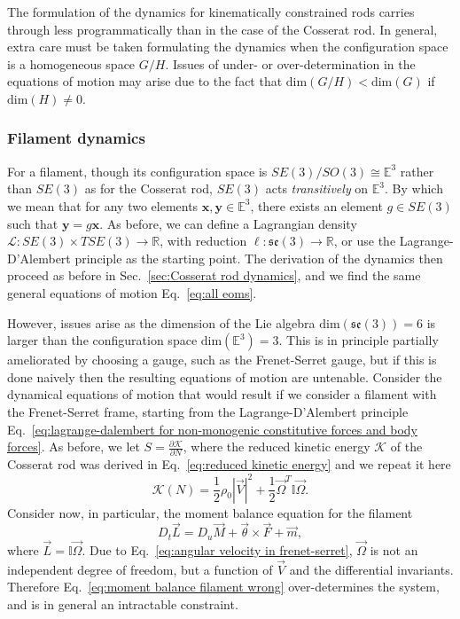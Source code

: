 The formulation of the dynamics for kinematically constrained rods carries through less programmatically than in the case of the Cosserat rod. In general, extra care must be taken formulating the dynamics when the configuration space is a homogeneous space $G / H$. Issues of under- or over-determination in the equations of motion may arise due to the fact that $\text{dim}(G/H) < \text{dim}(G)$ if $\text{dim}(H) \neq 0$.

\subsubsection*{Filament dynamics}

For a filament, though its configuration space is $SE(3)/SO(3) \cong \mathbb{E}^3$ rather than $SE(3)$ as for the Cosserat rod, $SE(3)$ acts \textit{transitively} on $\mathbb{E}^3$. By which we mean that for any two elements $\mathbf{x}, \mathbf{y} \in \mathbb{E}^3$, there exists an element $g \in SE(3)$ such that $\mathbf{y} = g \mathbf{x}$. As before, we can define a Lagrangian density $\mathcal{L} : SE(3) \times TSE(3) \to \mathbb{R}$, with reduction $\ell : \mathfrak{se}(3) \to \mathbb{R}$, or use the Lagrange-D'Alembert principle as the starting point. The derivation of the dynamics then proceed as before in Sec.~\ref{sec:Cosserat rod dynamics}, and we find the same general equations of motion Eq.~\ref{eq:all eoms}.

However, issues arise as the dimension of the Lie algebra $\text{dim}(\mathfrak{se}(3)) = 6$ is larger than the configuration space $\text{dim}(\mathbb{E}^3) = 3$. This is in principle partially ameliorated by choosing a gauge, such as the Frenet-Serret gauge, but if this is done naively then the resulting equations of motion are untenable. Consider the dynamical equations of motion that would result if we consider a filament with the Frenet-Serret frame, starting from the Lagrange-D'Alembert principle Eq.~\ref{eq:lagrange-dalembert for non-monogenic constitutive forces and body forces}. As before, we let $S = \frac{\partial \mathcal{K}}{\partial N}$, where the reduced kinetic energy $\mathcal{K}$ of the Cosserat rod was derived in Eq.~\ref{eq:reduced kinetic energy} and we repeat it here
\begin{equation}
\mathcal{K}(N)  = \frac{1}{2} \rho_0 |\vec{V}|^2 +  \frac{1}{2} \vec{\Omega}^T \mathbb{I} \vec{\Omega}.
\end{equation}
Consider now, in particular, the moment balance equation for the filament
\begin{equation} \label{eq:moment balance filament wrong}
D_t \vec{L} = D_u \vec{M} + \vec{\theta} \times \vec{F} + \vec{m},
\end{equation}
where $\vec{L} = \mathbb{I} \vec{\Omega}$. Due to Eq.~\ref{eq:angular velocity in frenet-serret}, $\vec{\Omega}$ is not an independent degree of freedom, but a function of $\vec{V}$ and the differential invariants. Therefore Eq.~\ref{eq:moment balance filament wrong} over-determines the system, and is in general an intractable constraint.

